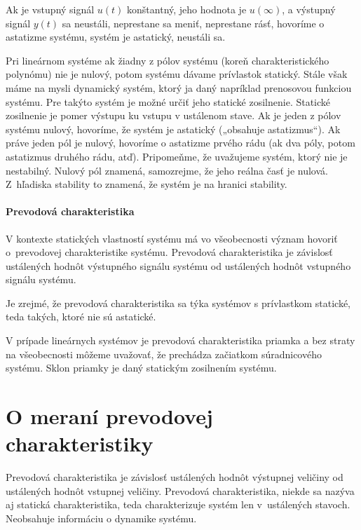 \documentclass[a4paper, 10pt, ]{article}
\begin{document}
Ak je vstupný signál $u(t)$ konštantný, jeho hodnota je $u(\infty)$, a výstupný signál $y(t)$ sa neustáli, neprestane sa meniť, neprestane rásť, hovoríme o astatizme systému, systém je astatický, neustáli sa.


\smallskip

Pri lineárnom systéme ak žiadny z pólov systému (koreň charakteristického polynómu) nie je nulový, potom systému dávame prívlastok statický. Stále však máme na mysli dynamický systém, ktorý ja daný napríklad prenosovou funkciou systému. Pre takýto systém je možné určiť jeho statické zosilnenie. Statické zosilnenie je pomer výstupu ku vstupu v ustálenom stave. Ak je jeden z pólov systému nulový, hovoríme, že systém je astatický („obsahuje astatizmus“). Ak práve jeden pól je nulový, hovoríme o astatizme prvého rádu (ak dva póly, potom astatizmus druhého rádu, atď). Pripomeňme, že uvažujeme systém, ktorý nie je nestabilný. Nulový pól znamená, samozrejme, že jeho reálna časť je nulová. Z~hľadiska stability to znamená, že systém je na hranici stability.


\paragraph{Prevodová charakteristika}

V kontexte statických vlastností systému má vo všeobecnosti význam hovoriť o~prevodovej charakteristike systému. Prevodová charakteristika je závislosť ustálených hodnôt výstupného signálu systému od ustálených hodnôt vstupného signálu systému.

Je zrejmé, že prevodová charakteristika sa týka systémov s prívlastkom statické, teda takých, ktoré nie sú astatické.

\smallskip

V prípade lineárnych systémov je prevodová charakteristika priamka a bez straty na všeobecnosti môžeme uvažovať, že prechádza začiatkom súradnicového systému. Sklon priamky je daný statickým zosilnením systému.







\section{O meraní prevodovej charakteristiky}


Prevodová charakteristika je závislosť ustálených hodnôt výstupnej veličiny od ustálených hodnôt vstupnej veličiny. Prevodová charakteristika, niekde sa nazýva aj statická charakteristika, teda charakterizuje systém len v~ustálených stavoch. Neobsahuje informáciu o dynamike systému.
\end{document}
